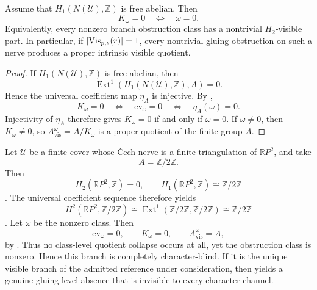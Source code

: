 \begin{corollary}\label{cor:h1-free-no-blindness}
Assume that $H_1(N(\mathcal U),\mathbb Z)$ is free abelian. Then
\[
K_{\omega}=0
\quad\Longleftrightarrow\quad
\omega=0.
\]
Equivalently, every nonzero branch obstruction class has a nontrivial $H_2$-visible part. In particular, if $|\mathrm{Vis}_{p,s}(r)|=1$, every nontrivial gluing obstruction on such a nerve produces a proper intrinsic visible quotient.
\end{corollary}

\begin{proof}
If $H_1(N(\mathcal U),\mathbb Z)$ is free abelian, then
\[
\operatorname{Ext}^1(H_1(N(\mathcal U),\mathbb Z),A)=0.
\]
Hence the universal coefficient map $\eta_A$ is injective. By ,
\[
K_{\omega}=0
\quad\Longleftrightarrow\quad
\mathrm{ev}_{\omega}=0
\quad\Longleftrightarrow\quad
\eta_A(\omega)=0.
\]
Injectivity of $\eta_A$ therefore gives $K_{\omega}=0$ if and only if $\omega=0$. If $\omega\neq 0$, then $K_{\omega}\neq 0$, so $A_{\mathrm{vis}}^{\omega}=A/K_{\omega}$ is a proper quotient of the finite group $A$.
\end{proof}

\begin{example}\label{ex:rp2-character-blind}
Let $\mathcal U$ be a finite cover whose \v{C}ech nerve is a finite triangulation of $\mathbb{R}P^2$, and take
\[
A=\mathbb Z/2\mathbb Z.
\]
Then
\[
H_2(\mathbb{R}P^2,\mathbb Z)=0,
\qquad
H_1(\mathbb{R}P^2,\mathbb Z)\cong \mathbb Z/2\mathbb Z
\]
\cite[Sec.~2.2]{Hatcher2002}. The universal coefficient sequence therefore yields
\[
H^2(\mathbb{R}P^2,\mathbb Z/2\mathbb Z)
\cong
\operatorname{Ext}^1(\mathbb Z/2\mathbb Z,\mathbb Z/2\mathbb Z)
\cong
\mathbb Z/2\mathbb Z
\]
\cite[Sec.~3.1]{Hatcher2002}. Let $\omega$ be the nonzero class. Then
\[
\mathrm{ev}_{\omega}=0,
\qquad
K_{\omega}=0,
\qquad
A_{\mathrm{vis}}^{\omega}=A,
\]
by . Thus no class-level quotient collapse occurs at all, yet the obstruction class is nonzero. Hence this branch is completely character-blind. If it is the unique visible branch of the admitted reference under consideration, then  yields a genuine gluing-level absence that is invisible to every character channel.
\end{example}

